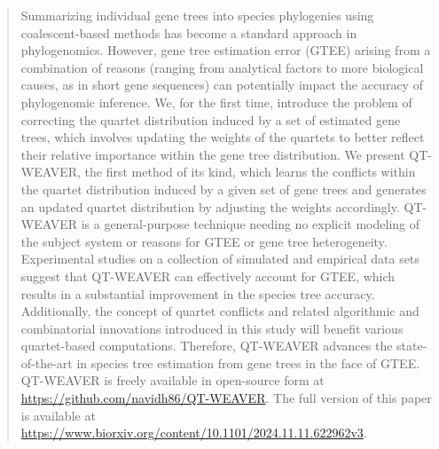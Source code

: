 \documentclass[runningheads]{llncs}
\begin{document}
\begin{abstract}
Summarizing individual gene trees into species phylogenies using coalescent-based methods has become a standard approach in phylogenomics. 
However, gene tree estimation error (GTEE) arising from a combination of reasons (ranging from analytical factors to more biological causes, as in short gene sequences) can potentially impact the accuracy of phylogenomic inference.
We, for the first time, introduce the problem of correcting the quartet distribution induced by a set of estimated gene trees, which involves updating the weights of the quartets to better reflect their relative importance within the gene tree distribution. We present QT-WEAVER, the first method of its kind, which learns the conflicts within the quartet distribution induced by a given set of gene trees and generates an updated quartet distribution by adjusting the weights accordingly. QT-WEAVER is a general-purpose technique needing no explicit modeling of the subject system or reasons for GTEE or gene tree heterogeneity. Experimental studies on a collection of simulated and empirical data sets suggest that QT-WEAVER can effectively account for GTEE, which results in a substantial improvement in the species tree accuracy. Additionally, the concept of quartet conflicts and related algorithmic and combinatorial innovations introduced in this study will benefit various quartet-based computations. Therefore, QT-WEAVER advances the state-of-the-art in species tree estimation from gene trees in the face of GTEE. QT-WEAVER is freely available in open-source form at \url{https://github.com/navidh86/QT-WEAVER}. The full version of this paper is available at \url{https://www.biorxiv.org/content/10.1101/2024.11.11.622962v3}.






\end{abstract}
\end{document}
